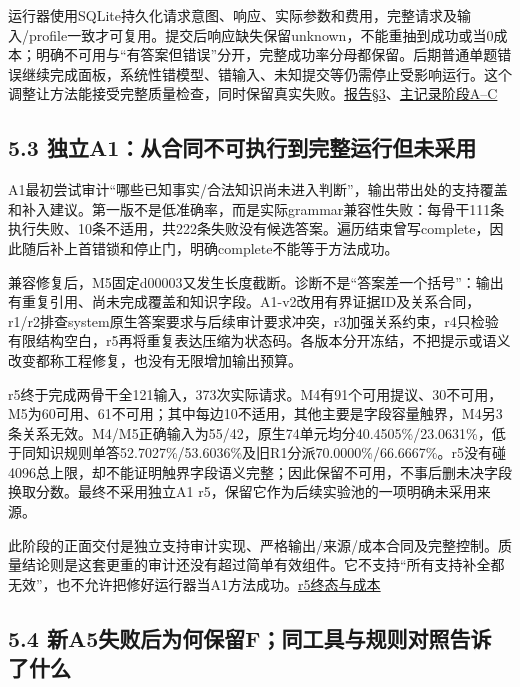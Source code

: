 \documentclass[
  11pt,
  a4paper,
]{article}
\begin{document}
运行器使用SQLite持久化请求意图、响应、实际参数和费用，完整请求及输入/profile一致才可复用。提交后响应缺失保留unknown，不能重抽到成功或当0成本；明确不可用与``有答案但错误''分开，完整成功率分母都保留。后期普通单题错误继续完成面板，系统性错模型、错输入、未知提交等仍需停止受影响运行。这个调整让方法能接受完整质量检查，同时保留真实失败。\href{https://github.com/xiotakut/cf_mrg/blob/main/papers/2026-10-02_cf_moa/author_dossier/records/research/cf_moa_experiment_report.md\#L101}{报告§3}、\href{https://github.com/xiotakut/cf_mrg/blob/main/papers/2026-10-02_cf_moa/author_dossier/records/research/cf_moa.md\#L40}{主记录阶段A--C}

\subsection{5.3
独立A1：从合同不可执行到完整运行但未采用}\label{ux72ecux7acba1ux4eceux5408ux540cux4e0dux53efux6267ux884cux5230ux5b8cux6574ux8fd0ux884cux4f46ux672aux91c7ux7528}

A1最初尝试审计``哪些已知事实/合法知识尚未进入判断''，输出带出处的支持覆盖和补入建议。第一版不是低准确率，而是实际grammar兼容性失败：每骨干111条执行失败、10条不适用，共222条失败没有候选答案。遍历结束曾写complete，因此随后补上首错锁和停止门，明确complete不能等于方法成功。

兼容修复后，M5固定d00003又发生长度截断。诊断不是``答案差一个括号''：输出有重复引用、尚未完成覆盖和知识字段。A1-v2改用有界证据ID及关系合同，r1/r2排查system原生答案要求与后续审计要求冲突，r3加强关系约束，r4只检验有限结构空白，r5再将重复表达压缩为状态码。各版本分开冻结，不把提示或语义改变都称工程修复，也没有无限增加输出预算。

r5终于完成两骨干全121输入，373次实际请求。M4有91个可用提议、30不可用，M5为60可用、61不可用；其中每边10不适用，其他主要是字段容量触界，M4另3条关系无效。M4/M5正确输入为55/42，原生74单元均分40.4505\%/23.0631\%，低于同知识规则单答52.7027\%/53.6036\%及旧R1分派70.0000\%/66.6667\%。r5没有碰4096总上限，却不能证明触界字段语义完整；因此保留不可用，不事后删未决字段换取分数。最终不采用独立A1
r5，保留它作为后续实验池的一项明确未采用来源。

此阶段的正面交付是独立支持审计实现、严格输出/来源/成本合同及完整控制。质量结论则是这套更重的审计还没有超过简单有效组件。它不支持``所有支持补全都无效''，也不允许把修好运行器当A1方法成功。\href{https://github.com/xiotakut/cf_mrg/blob/main/papers/2026-10-02_cf_moa/author_dossier/records/research/cf_moa_experiment_report.md\#L291}{r5终态与成本}

\subsection{5.4
新A5失败后为何保留F；同工具与规则对照告诉了什么}\label{ux65b0a5ux5931ux8d25ux540eux4e3aux4f55ux4fddux7559fux540cux5de5ux5177ux4e0eux89c4ux5219ux5bf9ux7167ux544aux8bc9ux4e86ux4ec0ux4e48}
\end{document}
